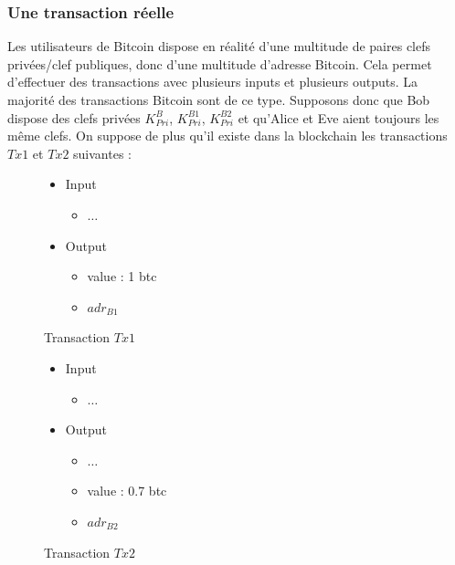 \documentclass[11pt,a4paper]{article}
\begin{document}
\subsubsection{Une transaction réelle}

Les utilisateurs de Bitcoin dispose en réalité d'une multitude de paires clefs privées/clef publiques, donc d'une multitude d'adresse Bitcoin. Cela permet d'effectuer des transactions avec plusieurs inputs et plusieurs outputs. La majorité des transactions Bitcoin sont de ce type. Supposons donc que Bob dispose des clefs privées $K^{B}_{Pri}$, $K^{B1}_{Pri}$, $K^{B2}_{Pri}$ et qu'Alice et Eve aient toujours les même clefs. On suppose de plus qu'il existe dans la blockchain les transactions $Tx1$ et $Tx2$ suivantes :\\


\begin{figure}[H]
\begin{itemize}
\renewcommand{\labelitemi}{$\bullet$}
\renewcommand{\labelitemii}{$\star$}

\item Input
\begin{itemize}
\item $\ldots$
\end{itemize}

\item Output
\begin{itemize}
\item value : 1 btc
\item $adr_{B1}$
\end{itemize}

\end{itemize}

\caption{Transaction $Tx1$}
\end{figure}

\begin{figure}[H]
\begin{itemize}
\renewcommand{\labelitemi}{$\bullet$}
\renewcommand{\labelitemii}{$\star$}

\item Input
\begin{itemize}
\item $\ldots$
\end{itemize}

\item Output
\begin{itemize}
\item $\ldots$
\item value : 0.7 btc
\item $adr_{B2}$
\end{itemize}

\end{itemize}

\caption{Transaction $Tx2$}
\end{figure}
\end{document}
